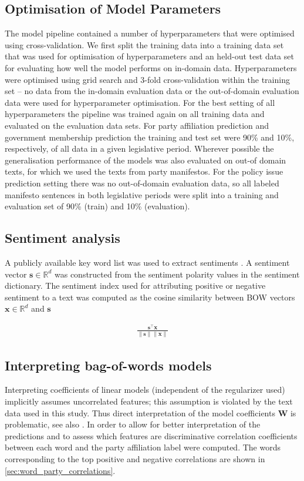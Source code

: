 \documentclass[11pt]{article}
\renewcommand{\vec}[1]{\mathbf{#1}}
\newcommand{\R}{\mathds{R}}
\begin{document}
\subsection{Optimisation of Model Parameters}\label{sec:crossvalidation}
The model pipeline contained a number of  hyperparameters that were optimised using cross-validation.
We first split the training data into a training data set that was used for optimisation of hyperparameters and an held-out test data set for evaluating how well the model performs on in-domain data. Hyperparameters were optimised using grid search and 3-fold cross-validation within the training set -- no data from the in-domain evaluation data or the out-of-domain evaluation data were used for hyperparameter optimisation. For the best setting of all hyperparameters the pipeline was trained again on all training data and evaluated on the evaluation data sets. For party affiliation prediction and government membership prediction the training and test set were 90\% and 10\%, respectively, of all data in a given legislative period. Wherever possible the generalisation performance of the models was also evaluated on out-of domain texts, for which we used the texts from party manifestos. For the policy issue prediction setting there was no out-of-domain evaluation data, so all labeled manifesto sentences in both legislative periods were split into a training and evaluation set of 90\% (train) and 10\% (evaluation).

\subsection{Sentiment analysis}\label{sec:sentiment_analysis_methods}
A publicly available key word list was used to extract sentiments \cite{remquahey2010}. A sentiment vector $\vec{s}\in\R^d$ was constructed from the sentiment polarity values in the sentiment dictionary. The sentiment index used for attributing positive or negative sentiment to a text was computed as the cosine similarity between BOW vectors $\vec{x}\in\R^d$ and $\vec{s}$

\begin{align}
\frac{\vec{s}^\top \vec{x}}{\|\vec{s}\|\|\vec{x}\|}
\end{align}

\subsection{Interpreting bag-of-words models}\label{sec:correlations_methods}
Interpreting coefficients of linear models (independent of the regularizer used) implicitly assumes uncorrelated features; this assumption is violated by the text data used in this study. Thus direct interpretation of the model coefficients $\vec{W}$ is problematic, see also \cite{Zien2009, Haufe2013}. In order to allow for better interpretation of the predictions and to assess which features are discriminative correlation coefficients between each word and the party affiliation label were computed. The words corresponding to the top positive and negative correlations are shown in \autoref{sec:word_party_correlations}.
\end{document}
